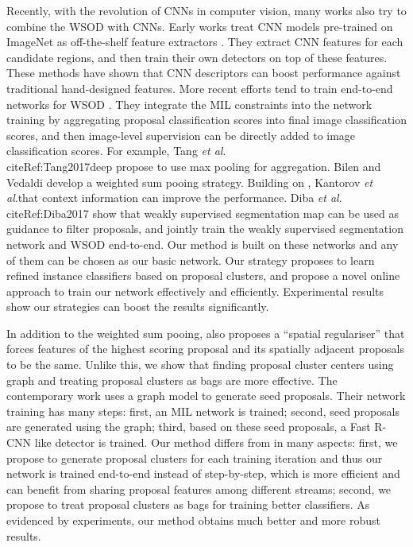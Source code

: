 \documentclass[10pt,journal,compsoc]{IEEEtran}
\def\etal{\emph{et al}.}
\begin{document}
Recently, with the revolution of CNNs in computer vision, many works also try to combine the WSOD with CNNs.
Early works treat CNN models pre-trained on ImageNet as off-the-shelf feature extractors \cite{Ref:Song2014learning,Ref:Song2014,Ref:Cinbis2017,Ref:Bilen2015,Ref:Wang2015,Ref:Wang2014,Ref:Ren2016,Ref:Shi2017}.
They extract CNN features for each candidate regions, and then train their own detectors on top of these features.
These methods have shown that CNN descriptors can boost performance against traditional hand-designed features.
More recent efforts tend to train end-to-end networks for WSOD \cite{Ref:Tang2017deep,Ref:Bilen2016,Ref:Kantorov2016,Ref:Diba2017}.
They integrate the MIL constraints into the network training by aggregating proposal classification scores into final image classification scores,
and then image-level supervision can be directly added to image classification scores.
For example, Tang \etal\\cite{Ref:Tang2017deep} propose to use max pooling for aggregation.
Bilen and Vedaldi \cite{Ref:Bilen2016} develop a weighted sum pooing strategy.
Building on \cite{Ref:Bilen2016}, Kantorov \etal\argue that context information can improve the performance.
Diba \etal\\cite{Ref:Diba2017} show that weakly supervised segmentation map can be used as guidance to filter proposals,
and jointly train the weakly supervised segmentation network and WSOD end-to-end.
Our method is built on these networks and any of them can be chosen as our basic network.
Our strategy proposes to learn refined instance classifiers based on proposal clusters,
and propose a novel online approach to train our network effectively and efficiently.
Experimental results show our strategies can boost the results significantly.

In addition to the weighted sum pooing,
\cite{Ref:Bilen2016} also proposes a ``spatial regulariser'' that forces features of the highest scoring proposal and its spatially adjacent proposals to be the same.
Unlike this, we show that finding proposal cluster centers using graph
and treating proposal clusters as bags are more effective.
The contemporary work \cite{Ref:Jie2017} uses a graph model to generate seed proposals.
Their network training has many steps:
first, an MIL network \cite{Ref:Wei2016} is trained;
second, seed proposals are generated using the graph;
third, based on these seed proposals, a Fast R-CNN \cite{Ref:Girshick2015} like detector is trained.
Our method differs from \cite{Ref:Jie2017} in many aspects:
first, we propose to generate proposal clusters for each training iteration
and thus our network is trained end-to-end instead of step-by-step,
which is more efficient and can benefit from sharing proposal features among different streams;
second, we propose to treat proposal clusters as bags for training better classifiers.
As evidenced by experiments, our method obtains much better and more robust results.
\end{document}
